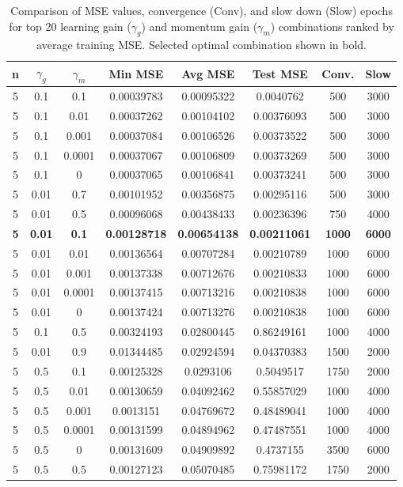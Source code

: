 \documentclass[11pt,pdftex,portrait,letterpaper]{article}
\begin{document}
\begin{table}[h]
\label{t:gainCombos}
\centering
\begin{tabular}{|c|c|c|c|c|c|c|c|}
\hline
\textbf{n} & \textbf{$\gamma_g$} & \textbf{$\gamma_m$} & \textbf{Min MSE} & \textbf{Avg MSE} & \textbf{Test MSE} & \textbf{Conv.} & \textbf{Slow} \\ 
\hline
5  & 0.1  & 0.1   & 0.00039783 & 0.00095322 & 0.0040762  & 500  & 3000  \\ 
5  & 0.1  & 0.01  & 0.00037262 & 0.00104102 & 0.00376093 & 500  & 3000  \\ 
5  & 0.1  & 0.001 & 0.00037084 & 0.00106526 & 0.00373522 & 500  & 3000  \\ 
5  & 0.1  & 0.0001& 0.00037067 & 0.00106809 & 0.00373269 & 500  & 3000  \\ 
5  & 0.1  & 0     & 0.00037065 & 0.00106841 & 0.00373241 & 500  & 3000  \\ 
5  & 0.01 & 0.7   & 0.00101952 & 0.00356875 & 0.00295116 & 500  & 3000  \\ 
5  & 0.01 & 0.5   & 0.00096068 & 0.00438433 & 0.00236396 & 750  & 4000  \\ 
\textbf{5}  & \textbf{0.01} & \textbf{0.1}  & \textbf{0.00128718} & \textbf{0.00654138} & \textbf{0.00211061} & \textbf{1000} & \textbf{6000} \\ 
5  & 0.01 & 0.01  & 0.00136564 & 0.00707284 & 0.00210789 & 1000 & 6000  \\
5  & 0.01 & 0.001 & 0.00137338 & 0.00712676 & 0.00210833 & 1000 & 6000  \\ 
5  & 0.01 & 0.0001& 0.00137415 & 0.00713216 & 0.00210838 & 1000 & 6000  \\ 
5  & 0.01 & 0     & 0.00137424 & 0.00713276 & 0.00210838 & 1000 & 6000  \\ 
5  & 0.1  & 0.5   & 0.00324193 & 0.02800445 & 0.86249161 & 1000 & 4000  \\ 
5  & 0.01 & 0.9   & 0.01344485 & 0.02924594 & 0.04370383 & 1500 & 2000  \\ 
5  & 0.5  & 0.1   & 0.00125328 & 0.0293106  & 0.5049517  & 1750 & 2000  \\ 
5  & 0.5  & 0.01  & 0.00130659 & 0.04092462 & 0.55857029 & 1000 & 4000  \\ 
5  & 0.5  & 0.001 & 0.0013151  & 0.04769672 & 0.48489041 & 1000 & 4000  \\ 
5  & 0.5  & 0.0001& 0.00131599 & 0.04894962 & 0.47487551 & 1000 & 4000  \\ 
5  & 0.5  & 0     & 0.00131609 & 0.04909892 & 0.4737155  & 3500 & 6000  \\ 
5  & 0.5  & 0.5   & 0.00127123 & 0.05070485 & 0.75981172 & 1750 & 2000  \\ 
\hline
\end{tabular}
\caption{Comparison of MSE values, convergence (Conv), and slow down (Slow) epochs for top 20 learning gain ($\gamma_g$) and momentum gain ($\gamma_m$) combinations ranked by average training MSE. Selected optimal combination shown in bold.}
\end{table}
\end{document}
